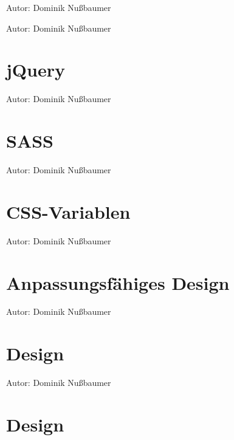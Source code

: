 \documentclass[
    headings=optiontotocandhead,%
    twoside,
    numbers=noenddot,%
    toc=flat, %
    12pt, %
    titlepage, %
    parskip=full, %
    listof=totoc, %
    listof=flat, %
    numbers=noenddot, %
    bibliography=totoc, %
    a4paper,DIV=14,
    BCOR=15mm,
]{scrbook}
\begin{document}
    {Autor: Dominik Nußbaumer}

    {Autor: Dominik Nußbaumer}

\section{jQuery}\label{jQuery}

    {Autor: Dominik Nußbaumer}

\section{SASS}\label{SASS}

    {Autor: Dominik Nußbaumer}

\section{CSS-Variablen}\label{CSS-Variablen}

    {Autor: Dominik Nußbaumer}

\section{Anpassungsfähiges Design}\label{Anpassungsfähiges Design}

    {Autor: Dominik Nußbaumer}

\section{Design}\label{Design}

    {Autor: Dominik Nußbaumer}

\renewcommand{\kapitelautor}{Autor: Dominik Nußbaumer}

% 

\section{Design}\label{Design}

\renewcommand{\kapitelautor}{Autor: Dominik Nußbaumer}

% 
\end{document}
